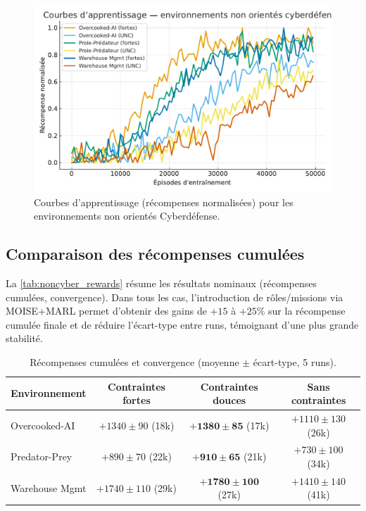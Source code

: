 \begin{figure}[h!]
  \centering
  \includegraphics[width=0.75\linewidth]{figures/results_noncyber_learning.pdf}
  \caption{Courbes d'apprentissage (récompenses normalisées) pour les environnements non orientés Cyberdéfense.}
  \label{fig:noncyber_learning_curves}
\end{figure}

\subsection*{Comparaison des récompenses cumulées}

La \autoref{tab:noncyber_rewards} résume les résultats nominaux (récompenses cumulées, convergence).
Dans tous les cas, l'introduction de rôles/missions via MOISE+MARL permet d'obtenir des gains de $+15$ à $+25\%$ sur la récompense cumulée finale et de réduire l'écart-type entre runs, témoignant d'une plus grande stabilité.

\begin{table}[h!]
  \centering
  \caption{Récompenses cumulées et convergence (moyenne $\pm$ écart-type, 5 runs).}
  \label{tab:noncyber_rewards}
  \renewcommand{\arraystretch}{1.2}
  \small
  \begin{tabular}{lccc}
    \hline
    \textbf{Environnement} & \textbf{Contraintes fortes} & \textbf{Contraintes douces}    & \textbf{Sans contraintes} \\
    \hline
    Overcooked-AI          & $+1340 \pm 90$ (18k)        & $\mathbf{+1380 \pm 85}$ (17k)  & $+1110 \pm 130$ (26k)     \\
    Predator-Prey          & $+890 \pm 70$ (22k)         & $\mathbf{+910 \pm 65}$ (21k)   & $+730 \pm 100$ (34k)      \\
    Warehouse Mgmt         & $+1740 \pm 110$ (29k)       & $\mathbf{+1780 \pm 100}$ (27k) & $+1410 \pm 140$ (41k)     \\
    \hline
  \end{tabular}
\end{table}

